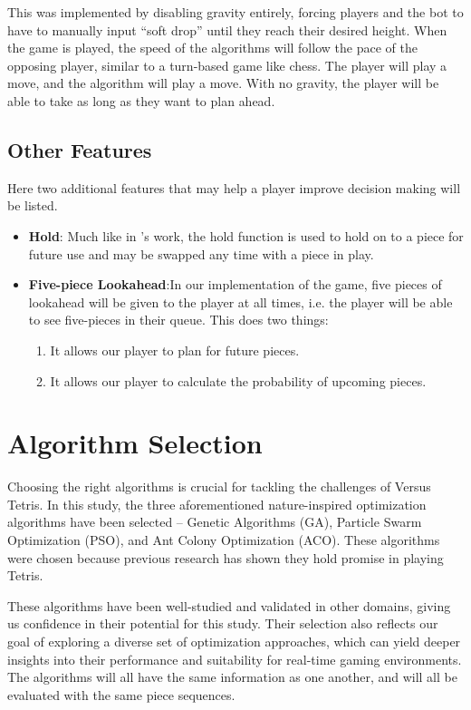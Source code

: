 \documentclass[a4paper, 12pt]{extreport}
\begin{document}
	This was implemented by disabling gravity entirely, forcing players and the bot to have to manually input ``soft drop'' until they reach their desired height. When the game is played, the speed of the algorithms will follow the pace of the opposing player, similar to a turn-based game like chess. The player will play a move, and the algorithm will play a move. With no gravity, the player will be able to take as long as they want to plan ahead.
	
	\subsection{Other Features}
	
	Here two additional features that may help a player improve decision making will be listed.
	
	\begin{itemize}
		\item \textbf{Hold}: Much like in \citeauthor{tetris-drl-2}'s \cite{tetris-drl-2} work, the hold function is used to hold on to a piece for future use and may be swapped any time with a piece in play.
		\item \textbf{Five-piece Lookahead}:In our implementation of the game, five pieces of lookahead will be given to the player at all times, i.e. the player will be able to see five-pieces in their queue. This does two things:
		\begin{enumerate}
			\item It allows our player to plan for future pieces.
			\item It allows our player to calculate the probability of upcoming pieces.
		\end{enumerate}
	\end{itemize}
	
	\section{Algorithm Selection}\label{sec:algo-select}
	Choosing the right algorithms is crucial for tackling the challenges of Versus Tetris. In this study, the three aforementioned nature-inspired optimization algorithms have been selected -- Genetic Algorithms (GA), Particle Swarm Optimization (PSO), and Ant Colony Optimization (ACO). These algorithms were chosen because previous research has shown they hold promise in playing Tetris.
	
	These algorithms have been well-studied and validated in other domains, giving us confidence in their potential for this study. Their selection also reflects our goal of exploring a diverse set of optimization approaches, which can yield deeper insights into their performance and suitability for real-time gaming environments. The algorithms will all have the same information as one another, and will all be evaluated with the same piece sequences.
	
\end{document}
